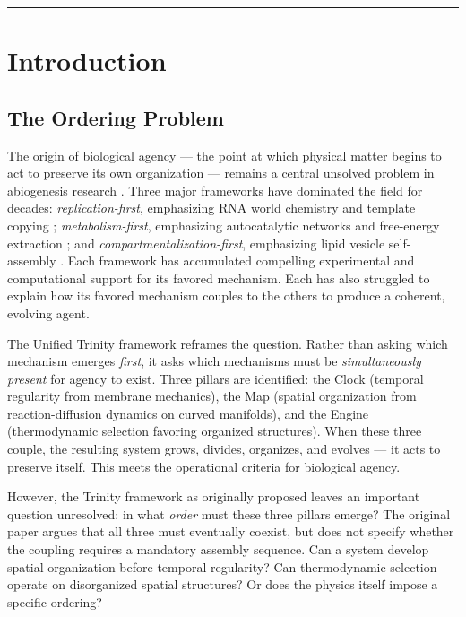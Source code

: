 \documentclass[11pt,letterpaper]{article}
\begin{document}
\vspace{1em}
\hrule
\vspace{1em}

\section{Introduction}

\subsection{The Ordering Problem}

The origin of biological agency --- the point at which physical matter begins to act to preserve its own organization --- remains a central unsolved problem in abiogenesis research \citep{pross2012whatislife,deamer2019assembling,pascal2013towards}. Three major frameworks have dominated the field for decades: \emph{replication-first}, emphasizing RNA world chemistry and template copying \citep{joyce2002antiquity,robertson2012origins,orgel2004prebiotic}; \emph{metabolism-first}, emphasizing autocatalytic networks and free-energy extraction \citep{wachtershauser1988before,kauffman1986autocatalytic,shapiro2006small,russell1997emergence}; and \emph{compartmentalization-first}, emphasizing lipid vesicle self-assembly \citep{deamer1997first,szostak2001synthesizing,luisi2006emergence}. Each framework has accumulated compelling experimental and computational support for its favored mechanism. Each has also struggled to explain how its favored mechanism couples to the others to produce a coherent, evolving agent.

The Unified Trinity framework \citep{farina2025trinity} reframes the question. Rather than asking which mechanism emerges \emph{first}, it asks which mechanisms must be \emph{simultaneously present} for agency to exist. Three pillars are identified: the Clock (temporal regularity from membrane mechanics), the Map (spatial organization from reaction-diffusion dynamics on curved manifolds), and the Engine (thermodynamic selection favoring organized structures). When these three couple, the resulting system grows, divides, organizes, and evolves --- it acts to preserve itself. This meets the operational criteria for biological agency.

However, the Trinity framework as originally proposed leaves an important question unresolved: in what \emph{order} must these three pillars emerge? The original paper argues that all three must eventually coexist, but does not specify whether the coupling requires a mandatory assembly sequence. Can a system develop spatial organization before temporal regularity? Can thermodynamic selection operate on disorganized spatial structures? Or does the physics itself impose a specific ordering?
\end{document}
